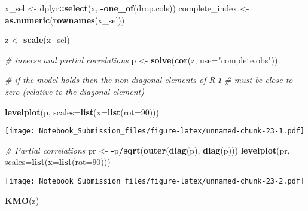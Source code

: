 \documentclass[
]{article}
\newenvironment{Shaded}{\begin{snugshade}}{\end{snugshade}}
\newcommand{\CommentTok}[1]{\textcolor[rgb]{0.56,0.35,0.01}{\textit{#1}}}
\newcommand{\DataTypeTok}[1]{\textcolor[rgb]{0.13,0.29,0.53}{#1}}
\newcommand{\DecValTok}[1]{\textcolor[rgb]{0.00,0.00,0.81}{#1}}
\newcommand{\KeywordTok}[1]{\textcolor[rgb]{0.13,0.29,0.53}{\textbf{#1}}}
\newcommand{\NormalTok}[1]{#1}
\newcommand{\OperatorTok}[1]{\textcolor[rgb]{0.81,0.36,0.00}{\textbf{#1}}}
\newcommand{\StringTok}[1]{\textcolor[rgb]{0.31,0.60,0.02}{#1}}
\begin{document}
\begin{Shaded}
\begin{Highlighting}[]
\NormalTok{x_sel <-}\StringTok{ }\NormalTok{dplyr}\OperatorTok{::}\KeywordTok{select}\NormalTok{(x, }\OperatorTok{-}\KeywordTok{one_of}\NormalTok{(drop.cols))}
\NormalTok{complete_index <-}\StringTok{ }\KeywordTok{as.numeric}\NormalTok{(}\KeywordTok{rownames}\NormalTok{(x_sel))}

\NormalTok{z <-}\StringTok{ }\KeywordTok{scale}\NormalTok{(x_sel)}

\CommentTok{# inverse and partial correlations}
\NormalTok{p  <-}\StringTok{ }\KeywordTok{solve}\NormalTok{(}\KeywordTok{cor}\NormalTok{(z, }\DataTypeTok{use=}\StringTok{"complete.obs"}\NormalTok{))}

\CommentTok{# if the model holds then the non-diagonal elements of R􀀀1}
\CommentTok{# must be close to zero (relative to the diagonal element)}

\KeywordTok{levelplot}\NormalTok{(p, }\DataTypeTok{scales=}\KeywordTok{list}\NormalTok{(}\DataTypeTok{x=}\KeywordTok{list}\NormalTok{(}\DataTypeTok{rot=}\DecValTok{90}\NormalTok{)))}
\end{Highlighting}
\end{Shaded}

\texttt{[image: Notebook\_Submission\_files/figure-latex/unnamed-chunk-23-1.pdf]}

\begin{Shaded}
\begin{Highlighting}[]
\CommentTok{# Partial correlations}
\NormalTok{pr <-}\StringTok{ }\OperatorTok{-}\NormalTok{p}\OperatorTok{/}\KeywordTok{sqrt}\NormalTok{(}\KeywordTok{outer}\NormalTok{(}\KeywordTok{diag}\NormalTok{(p), }\KeywordTok{diag}\NormalTok{(p)))}
\KeywordTok{levelplot}\NormalTok{(pr, }\DataTypeTok{scales=}\KeywordTok{list}\NormalTok{(}\DataTypeTok{x=}\KeywordTok{list}\NormalTok{(}\DataTypeTok{rot=}\DecValTok{90}\NormalTok{)))}
\end{Highlighting}
\end{Shaded}

\texttt{[image: Notebook\_Submission\_files/figure-latex/unnamed-chunk-23-2.pdf]}

\begin{Shaded}
\begin{Highlighting}[]
\KeywordTok{KMO}\NormalTok{(z)}
\end{Highlighting}
\end{Shaded}
\end{document}
